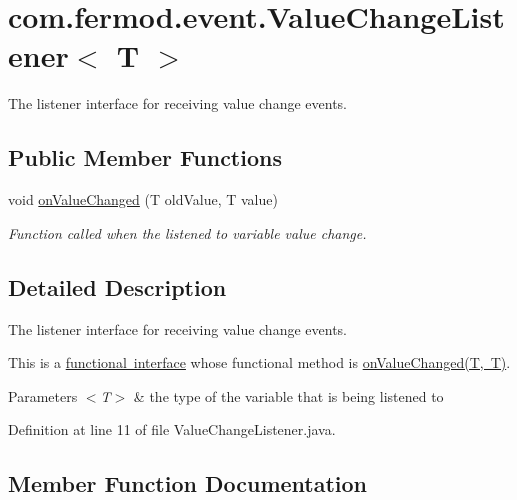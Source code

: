 \hypertarget{interfacecom_1_1fermod_1_1event_1_1ValueChangeListener}{}\section{com.\+fermod.\+event.\+Value\+Change\+Listener$<$ T $>$}
\label{interfacecom_1_1fermod_1_1event_1_1ValueChangeListener}


The listener interface for receiving value change events.  


\subsection*{Public Member Functions}
\begin{DoxyCompactItemize}
\item 
void \mbox{\hyperlink{interfacecom_1_1fermod_1_1event_1_1ValueChangeListener_aa1a058002e2401b5101009155a699482}{on\+Value\+Changed}} (T old\+Value, T value)
\begin{DoxyCompactList}\small\item\em Function called when the listened to variable value change. \end{DoxyCompactList}\end{DoxyCompactItemize}


\subsection{Detailed Description}
The listener interface for receiving value change events. 

This is a \mbox{\hyperlink{}{functional interface}} whose functional method is \mbox{\hyperlink{interfacecom_1_1fermod_1_1event_1_1ValueChangeListener_aa1a058002e2401b5101009155a699482}{on\+Value\+Changed(\+T, T)}}.


\begin{DoxyParams}{Parameters}
{\em $<$\+T$>$} & the type of the variable that is being listened to \\
\hline
\end{DoxyParams}


Definition at line 11 of file Value\+Change\+Listener.\+java.



\subsection{Member Function Documentation}
\mbox{\label{interfacecom_1_1fermod_1_1event_1_1ValueChangeListener_aa1a058002e2401b5101009155a699482}} 
